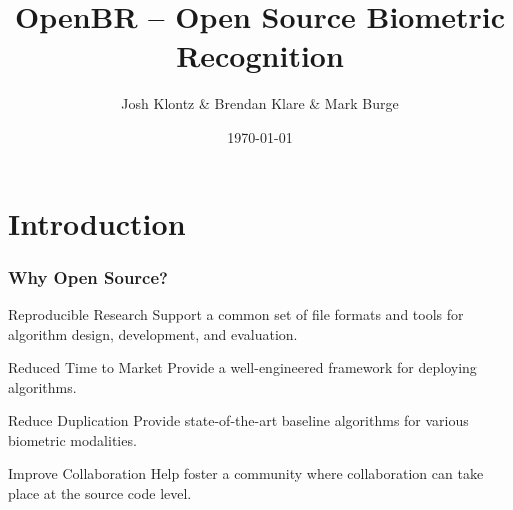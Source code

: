 \documentclass[12pt]{beamer}
\title[OpenBR]{OpenBR -- Open Source Biometric Recognition}
\author[J. Klontz \& B. Klare \& M. Burge]{Josh Klontz \& Brendan Klare \& Mark Burge}
\institute[]
{
www.openbiometrics.org \\
\medskip
{\emph{openbr-dev@googlegroups.com}}
}
\date{\today}
\begin{document}
\begin{frame}
\titlepage
\end{frame}

\section{Introduction}
\begin{frame}
\frametitle{Why Open Source?}
\pause
\begin{block}{Reproducible Research}
Support a common set of file formats and tools for algorithm design, development, and evaluation.
\end{block}
\pause
\begin{block}{Reduced Time to Market}
Provide a well-engineered framework for deploying algorithms.
\end{block}
\pause
\begin{block}{Reduce Duplication}
Provide state-of-the-art baseline algorithms for various biometric modalities.
\end{block}
\pause
\begin{block}{Improve Collaboration}
Help foster a community where collaboration can take place at the source code level.
\end{block}
\end{frame}
\end{document}
